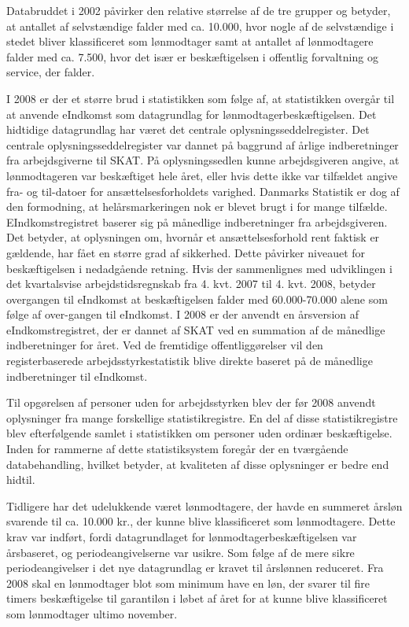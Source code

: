Databruddet i 2002 påvirker den relative størrelse af de tre grupper og betyder, at antallet af selvstændige falder med ca. 10.000, hvor nogle af de selvstændige i stedet bliver klassificeret som lønmodtager samt at antallet af lønmodtagere falder med ca. 7.500, hvor det især er beskæftigelsen i offentlig forvaltning og service, der falder.

I 2008 er der et større brud i statistikken som følge af, at statistikken overgår til at anvende eIndkomst som datagrundlag for lønmodtagerbeskæftigelsen. Det hidtidige datagrundlag har været det centrale oplysningsseddelregister. Det centrale oplysningsseddelregister var dannet på baggrund af årlige indberetninger fra arbejdsgiverne til SKAT. På oplysningssedlen kunne arbejdsgiveren angive, at lønmodtageren var beskæftiget hele året, eller hvis dette ikke var tilfældet angive fra- og til-datoer for ansættelsesforholdets varighed. Danmarks Statistik er dog af den formodning, at helårsmarkeringen nok er blevet brugt i for mange tilfælde. EIndkomstregistret baserer sig på månedlige indberetninger fra arbejdsgiveren. Det betyder, at oplysningen om, hvornår et ansættelsesforhold rent faktisk er gældende, har fået en større grad af sikkerhed. Dette påvirker niveauet for beskæftigelsen i nedadgående retning. Hvis der sammenlignes med udviklingen i det kvartalsvise arbejdstidsregnskab fra 4. kvt. 2007 til 4. kvt. 2008, betyder overgangen til eIndkomst at beskæftigelsen falder med 60.000-70.000 alene som følge af over-gangen til eIndkomst. I 2008 er der anvendt en årsversion af eIndkomstregistret, der er dannet af SKAT ved en summation af de månedlige indberetninger for året. Ved de fremtidige offentliggørelser vil den registerbaserede arbejdsstyrkestatistik blive direkte baseret på de månedlige indberetninger til eIndkomst.

Til opgørelsen af personer uden for arbejdsstyrken blev der før 2008 anvendt oplysninger fra mange forskellige statistikregistre. En del af disse statistikregistre blev efterfølgende samlet i statistikken om personer uden ordinær beskæftigelse. Inden for rammerne af dette statistiksystem foregår der en tværgående databehandling, hvilket betyder, at kvaliteten af disse oplysninger er bedre end hidtil.

Tidligere har det udelukkende været lønmodtagere, der havde en summeret årsløn svarende til ca. 10.000 kr., der kunne blive klassificeret som lønmodtagere. Dette krav var indført, fordi datagrundlaget for lønmodtagerbeskæftigelsen var årsbaseret, og periodeangivelserne var usikre. Som følge af de mere sikre periodeangivelser i det nye datagrundlag er kravet til årslønnen reduceret. Fra 2008 skal en lønmodtager blot som minimum have en løn, der svarer til fire timers beskæftigelse til garantiløn i løbet af året for at kunne blive klassificeret som lønmodtager ultimo november.

